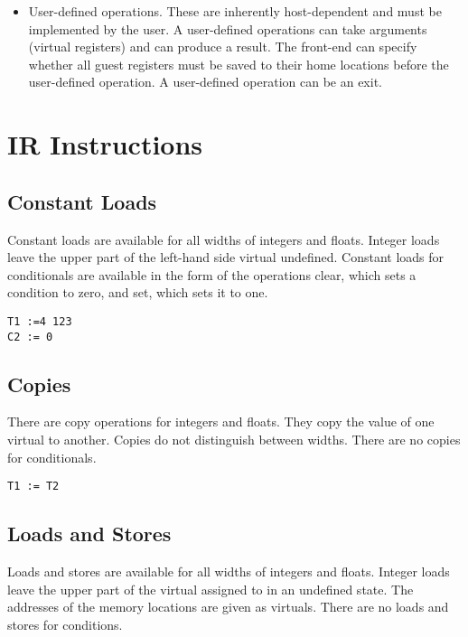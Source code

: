 \documentclass{article}
\begin{document}
\begin{itemize}
\item User-defined operations.  These are inherently host-dependent and
    must be implemented by the user.
    A user-defined operations can take arguments (virtual registers)
    and can produce a result.  The front-end can specify whether all
    guest registers must be saved to their home locations before the
    user-defined operation.  A user-defined operation can be an exit.
\end{itemize}

\section{IR Instructions}

\subsection{Constant Loads}

Constant loads are available for all widths of integers and floats.
Integer loads leave the upper part of the left-hand side virtual
undefined.  Constant loads for conditionals are available in the form
of the operations clear, which sets a condition to zero, and set,
which sets it to one.

\begin{verbatim}
T1 :=4 123
C2 := 0
\end{verbatim}

\subsection{Copies}

There are copy operations for integers and floats.  They copy the
value of one virtual to another.  Copies do not distinguish between
widths.  There are no copies for conditionals.

\begin{verbatim}
T1 := T2
\end{verbatim}

\subsection{Loads and Stores}

Loads and stores are available for all widths of integers and floats.
Integer loads leave the upper part of the virtual assigned to in an
undefined state.  The addresses of the memory locations are given as
virtuals.  There are no loads and stores for conditions.
\end{document}
